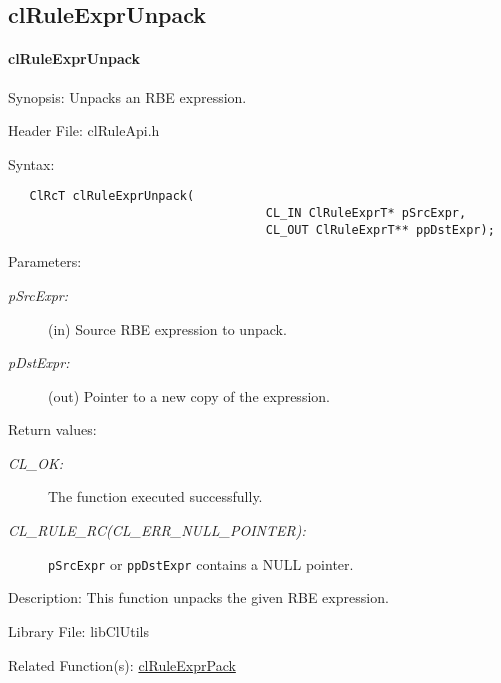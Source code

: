 \begin{flushleft}
\subsection{clRuleExprUnpack}
\hypertarget{pagerule119}{}\paragraph{cl\-Rule\-Expr\-Unpack}\label{pagerule119}
\begin{Desc}
\item[Synopsis:]Unpacks an RBE expression.\end{Desc}
\begin{Desc}
\item[Header File:]clRuleApi.h\end{Desc}
\begin{Desc}
\item[Syntax:]

\footnotesize\begin{verbatim}   ClRcT clRuleExprUnpack(
                              		CL_IN ClRuleExprT* pSrcExpr,
                              		CL_OUT ClRuleExprT** ppDstExpr);
\end{verbatim}
\normalsize
\end{Desc}
\begin{Desc}
\item[Parameters:]
\begin{description}
\item[{\em p\-Src\-Expr:}](in) Source RBE expression to unpack. \item[{\em p\-Dst\-Expr:}](out) Pointer to a new copy of the expression.\end{description}
\end{Desc}
\begin{Desc}
\item[Return values:]
\begin{description}
\item[{\em CL\_\-OK:}]The function executed successfully. \item[{\em CL\_\-RULE\_\-RC(CL\_\-ERR\_\-NULL\_\-POINTER):}]{\tt{pSrcExpr}} or {\tt{ppDstExpr}}
contains a NULL pointer.\end{description}
\end{Desc}
\begin{Desc}
\item[Description:]This function unpacks the given RBE expression.\end{Desc}
\begin{Desc}
\item[Library File:]lib\-Cl\-Utils\end{Desc}
\begin{Desc}
\item[Related Function(s):]\hyperlink{pagerule118}{cl\-Rule\-Expr\-Pack} \end{Desc}
\newpage



\end{flushleft}
